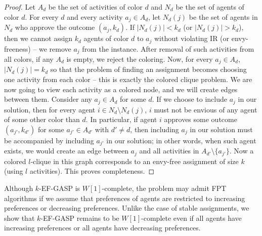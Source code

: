 \begin{proof}
	Let $A_d$ be the set of activities of color $d$ and $N_d$ be the set of agents of color $d$. For every $d$ and every activity $a_j \in A_d$, let $N_d(j)$ be the set of agents in $N_d$ who approve the outcome $(a_j, k_d)$. If $|N_d(j)| < k_d$ (or $|N_d(j)| > k_d$), then we cannot assign $k_d$ agents of color $d$ to $a_j$ without violating IR (or envy-freeness) -- we remove $a_j$ from the instance. After removal of such activities from all colors, if any $A_d$ is empty, we reject the coloring. Now, for every $a_j\in A_d$, $|N_d(j)| = k_d$ so that the problem of finding an assignment becomes choosing one activity from each color -- this is exactly the colored clique problem. We are now going to view each activity as a colored node, and we will create edges between them. 	
	 Consider any $a_j\in A_d$ for some $d$. If we choose to include $a_j$ in our solution, then for every agent $i \in N_d \setminus N_d(j)$, $i$ must not be envious of any agent of some other color than $d$. In particular, if agent $i$ approves some outcome $(a_{j'}, k_{d'})$ for some $a_{j'} \in A_{d'}$ with $d'\neq d$, then including $a_j$ in our solution must be accompanied by including $a_{j'}$ in our solution; in other words, when such agent exists, we would create an edge between $a_j$ and all activities in $A_{d'} \setminus \{a_{j'}\}$. Now a colored $l$-clique in this graph corresponds to an envy-free assignment of size $k$ (using $l$ activities). This proves completeness.
	
	
	
\end{proof}

Although $k$-EF-GASP is $W[1]$-complete, the problem may admit FPT algorithms if we assume that preferences of agents are restricted to increasing preferences or decreasing preferences. 
Unlike the case of stable assignments, we show that $k$-EF-GASP remains to be $W[1]$-complete even if all agents have increasing preferences or all agents have decreasing preferences. 

